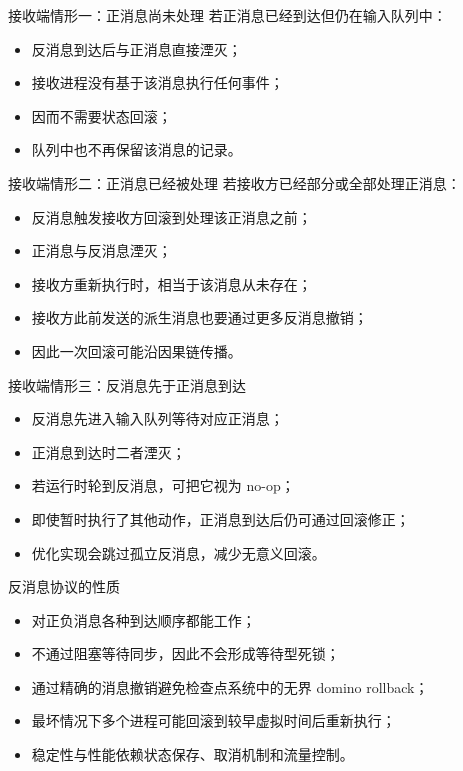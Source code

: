 \documentclass[UTF8,fontset=none,aspectratio=169,10pt]{beamer}
\begin{document}
\begin{frame}{接收端情形一：正消息尚未处理}
若正消息已经到达但仍在输入队列中：
\begin{itemize}
  \item 反消息到达后与正消息直接湮灭；
  \item 接收进程没有基于该消息执行任何事件；
  \item 因而不需要状态回滚；
  \item 队列中也不再保留该消息的记录。
\end{itemize}
\end{frame}

\begin{frame}{接收端情形二：正消息已经被处理}
若接收方已经部分或全部处理正消息：
\begin{itemize}
  \item 反消息触发接收方回滚到处理该正消息之前；
  \item 正消息与反消息湮灭；
  \item 接收方重新执行时，相当于该消息从未存在；
  \item 接收方此前发送的派生消息也要通过更多反消息撤销；
  \item 因此一次回滚可能沿因果链传播。
\end{itemize}
\end{frame}

\begin{frame}{接收端情形三：反消息先于正消息到达}
\begin{itemize}
  \item 反消息先进入输入队列等待对应正消息；
  \item 正消息到达时二者湮灭；
  \item 若运行时轮到反消息，可把它视为 no-op；
  \item 即使暂时执行了其他动作，正消息到达后仍可通过回滚修正；
  \item 优化实现会跳过孤立反消息，减少无意义回滚。
\end{itemize}
\end{frame}

\begin{frame}{反消息协议的性质}
\begin{itemize}
  \item 对正负消息各种到达顺序都能工作；
  \item 不通过阻塞等待同步，因此不会形成等待型死锁；
  \item 通过精确的消息撤销避免检查点系统中的无界 domino rollback；
  \item 最坏情况下多个进程可能回滚到较早虚拟时间后重新执行；
  \item 稳定性与性能依赖状态保存、取消机制和流量控制。
\end{itemize}
\end{frame}
\end{document}
